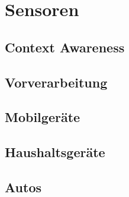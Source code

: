 \section{Sensoren}

\subsection{Context Awareness}

\subsection{Vorverarbeitung}

\subsection{Mobilgeräte}

\subsection{Haushaltsgeräte}

\subsection{Autos}